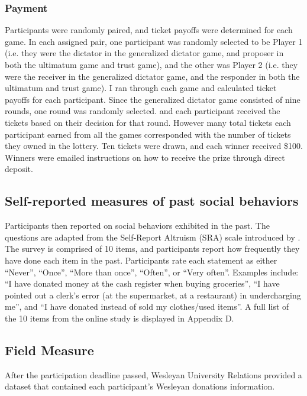 \documentclass[12pt]{article}
\begin{document}
\subsubsection{Payment}

Participants were randomly paired, and ticket payoffs were determined for each game. In each assigned pair, one participant was randomly selected to be Player 1 (i.e. they were the dictator in the generalized dictator game, and proposer in both the ultimatum game and trust game), and the other was Player 2 (i.e. they were the receiver in the generalized dictator game, and the responder in both the ultimatum and trust game). I ran through each game and calculated ticket payoffs for each participant. Since the generalized dictator game consisted of nine rounds, one round was randomly selected. and each participant received the tickets based on their decision for that round. However many total tickets each participant earned from all the games corresponded with the number of tickets they owned in the lottery. Ten tickets were drawn, and each winner received \$100. Winners were emailed instructions on how to receive the prize through direct deposit.

\subsection{Self-reported measures of past social behaviors}

Participants then reported on social behaviors exhibited in the past. The questions are adapted from the Self-Report Altruism (SRA) scale introduced by \cite{rushton_chrisjohn_fekken_1981}. The survey is comprised of 10 items, and participants report how frequently they have done each item in the past. Participants rate each statement as either ``Never'', ``Once'', ``More than once'', ``Often'', or ``Very often''. Examples include: ``I have donated money at the cash register when buying groceries'', ``I have pointed out a clerk\rq s error (at the supermarket, at a restaurant) in undercharging me'', and ``I have donated instead of sold my clothes/used items''. A full list of the 10 items from the online study is displayed in Appendix D. 

\subsection{Field Measure}

After the participation deadline passed, Wesleyan University Relations provided a dataset that contained each participant\rq s Wesleyan donations information.
\end{document}
